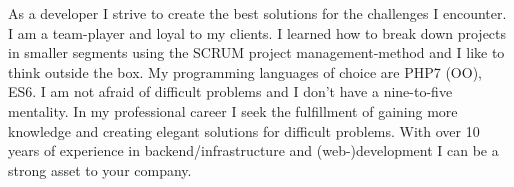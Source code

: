

\begin{cvparagraph}

As a developer I strive to create the best solutions for the challenges I encounter. I am a team-player and loyal to my clients. I learned how to break down projects in smaller segments using the SCRUM project management-method and I like to think outside the box. My programming languages of choice are PHP7 (OO), ES6. I am not afraid of difficult problems and I don't have a nine-to-five mentality. In my professional career I seek the fulfillment of gaining more knowledge and creating elegant solutions for difficult problems. With over 10 years of experience in backend/infrastructure and (web-)development I can be a strong asset to your company.
\end{cvparagraph}
